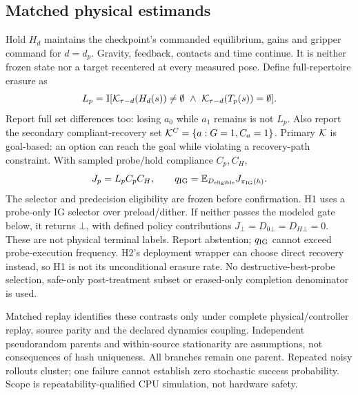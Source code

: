 \subsection{Matched physical estimands}
Hold $H_d$ maintains the checkpoint's commanded equilibrium, gains and gripper command for $d=d_p$. Gravity, feedback, contacts and time continue. It is neither frozen state nor a target recentered at every measured pose. Define full-repertoire erasure as
\begin{equation}
L_p=\mathbb I[\mathcal K_{\tau-d}(H_d(s))\ne\emptyset\ \land\
\mathcal K_{\tau-d}(T_p(s))=\emptyset].\label{eq:loss}
\end{equation}
Report full set differences too: losing $a_0$ while $a_1$ remains is not $L_p$. Also report the secondary compliant-recovery set $\mathcal K^C=\{a:G=1,C_a=1\}$. Primary $\mathcal K$ is goal-based: an option can reach the goal while violating a recovery-path constraint. With sampled probe/hold compliance $C_p,C_H$,
\begin{equation}
J_p=L_pC_pC_H,\qquad q_{\rm IG}=\mathbb E_{D_{\rm eligible}}J_{\pi_{\rm IG}(h)}.
\end{equation}
The selector and predecision eligibility are frozen before confirmation. H1 uses a probe-only IG selector over preload/dither. If neither passes the modeled gate below, it returns $\bot$, with defined policy contributions $J_\bot=D_{0\bot}=D_{H\bot}=0$. These are not physical terminal labels. Report abstention; $q_{\rm IG}$ cannot exceed probe-execution frequency. H2's deployment wrapper can choose direct recovery instead, so H1 is not its unconditional erasure rate. No destructive-best-probe selection, safe-only post-treatment subset or erased-only completion denominator is used.

Matched replay identifies these contrasts only under complete physical/controller replay, source parity and the declared dynamics coupling. Independent pseudorandom parents and within-source stationarity are assumptions, not consequences of hash uniqueness. All branches remain one parent. Repeated noisy rollouts cluster; one failure cannot establish zero stochastic success probability. Scope is repeatability-qualified CPU simulation, not hardware safety.

